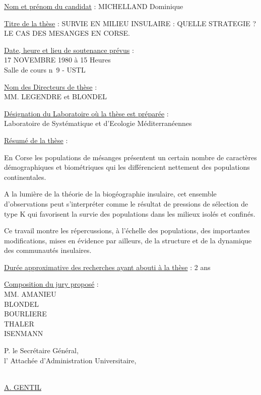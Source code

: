 \uline{Nom et prénom du candidat} : MICHELLAND Dominique

\uline{Titre de la thèse} : SURVIE EN MILIEU INSULAIRE : QUELLE STRATEGIE ? LE CAS DES MESANGES EN CORSE.

\uline{Date, heure et lieu de soutenance prévus} :\\
17 NOVEMBRE 1980 à 15 Heures\\
Salle de cours n\textdegree\ 9 - USTL

\uline{Nom des Directeurs de thèse} :\\
MM. LEGENDRE et BLONDEL

\uline{Désignation du Laboratoire où la thèse est préparée} :\\
Laboratoire de Systématique et d'Ecologie Méditerranéennes

\uline{Résumé de la thèse} :

En Corse les populations de mésanges présentent un certain nombre de caractères démographiques et biométriques qui les différencient nettement des populations continentales.

A la lumière de la théorie de la biogéographie insulaire, cet ensemble d'observations peut s'interpréter comme le résultat de pressions de sélection de type K qui favorisent la survie des populations dans les milieux isolés et confinés.

Ce travail montre les répercussions, à l'échelle des populations, des importantes modifications, mises en évidence par ailleurs, de la structure et de la dynamique des communautés insulaires.

\uline{Durée approximative des recherches ayant abouti à la thèse} : 2 ans

\uline{Composition du jury proposé} :\\
MM. AMANIEU\\
\hspace*{2em}BLONDEL\\
\hspace*{2em}BOURLIERE\\
\hspace*{2em}THALER\\
\hspace*{2em}ISENMANN

P. le Secrétaire Général,\\
l' Attachée d'Administration Universitaire,

\uline{}\\
\uline{A. GENTIL}


